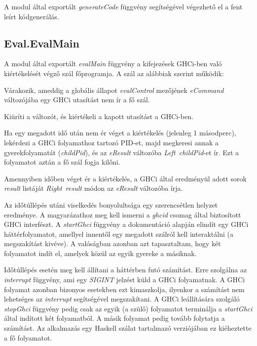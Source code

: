 A modul által exportált \textit{generateCode} függvény segítségével végezhető el a fent leírt kódgenerálás. 

\subsection{Eval.EvalMain}

A modul által exportált \textit{evalMain} függvény a kifejezések GHCi-ben való kiértékelését végző szál főprogramja. A szál az alábbiak szerint működik:

\begin{compactenum}
	\item Várakozik, ameddig a globális állapot \textit{evalControl} mezőjének \textit{eCommand} változójába egy GHCi utasítást nem ír a fő szál.
	\item Kiüríti a változót, és kiértékeli a kapott utasítást a GHCi-ben.
	\item Ha egy megadott idő után nem ér véget a kiértékelés (jelenleg 1 másodperc), lekérdezi a GHCi folyamathoz tartozó PID-et, majd megkeresi annak a gyerekfolyamatát (\textit{childPid}), és az \textit{eResult} változóba \textit{Left\ childPid}-et ír. Ezt a folyamatot aztán a fő szál fogja kilőni.
	\item Amennyiben időben véget ér a kiértékelés, a GHCi által eredményül adott sorok \textit{result} listáját \textit{Right\ result} módon az \textit{eResult} változóba írja.
\end{compactenum}

Az időtúllépés utáni viselkedés bonyolultsága egy szerencsétlen helyzet eredménye. A magyarázathoz meg kell ismerni a \textit{ghcid} csomag által biztosított GHCi interfészt. A \textit{startGhci} függvény a dokumentáció alapján elindít egy GHCi háttérfolyamatot, amellyel innentől egy megadott szálról kell interaktálni (a megszakítást kivéve). A valóságban azonban azt tapasztaltam, hogy két folyamatot indít el, amelyek közül az egyik gyereke a másiknak. 

Időtúllépés esetén meg kell állítani a háttérben futó számítást. Erre szolgálna az \textit{interrupt} függvény, ami egy \textit{SIGINT} jelzést küld a GHCi folyamatnak. A GHCi folyamat azonban bizonyos esetekben ezt kimaszkolja, ilyenkor a számítást nem lehetséges az \textit{interrupt} segítségével megszakítani. A GHCi leállítására szolgáló \textit{stopGhci} függvény pedig csak  az egyik (a szülő) folyamatot terminálja a \textit{startGhci} által indított két folyamatból. A másik folyamat pedig tovább folytatja a számítást. Az alkalmazás egy Haskell szálat tartalmazó verziójában ez kiéheztette a fő folyamatot. 

